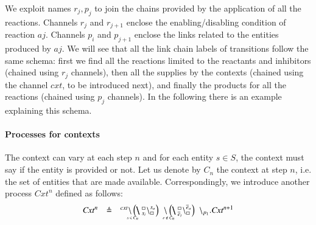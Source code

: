 \noindent
We exploit names $r_j,p_j$ to join the chains provided by the application of all the reactions. 
Channels $r_j$ and $r_{j+1}$ enclose the enabling/disabling condition of reaction $aj$.
Channels $p_i$ and $p_{j+1}$ enclose the links related to the entities produced by $aj$.
We will see that all the link chain labels of transitions follow the same schema: first we find all the reactions limited to the reactants and inhibitors (chained using $r_j$ channels), then all the supplies by the contexts (chained using the channel $\mathit{cxt}$, to be introduced next), and finally the products for all the reactions (chained using $p_j$ channels). 
In the following there is an example explaining this schema.

\paragraph{Processes for contexts}
The context can vary at each step $n$ and for each entity $s \in S$, the context must say if the entity is provided or not. Let us denote by $C_n$ the context at step $n$, i.e. the set of entities that are made available. Correspondingly, we introduce another process $\mathit{Cxt}^n$ defined as follows:
\[
\begin{array}{lcl}
\mathit{Cxt}^n &\defeq &
^{cxt} \backslash  \blockchain{s_i}{s_o}{s \in C_n} \, \link{}{} \blockchain{\overline{e}_i}{\overline{e}_o}{e \not\in C_n} \,  \backslash_{p_1}. \mathit{Cxt}^{n+1}
\end{array}
\]

